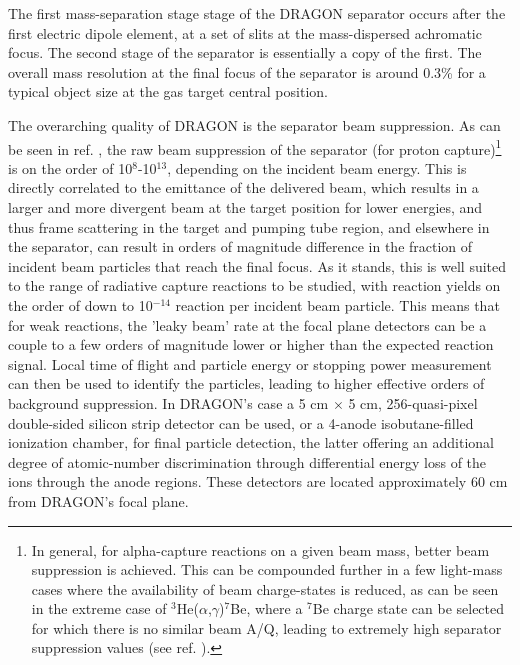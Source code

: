 The first mass-separation stage stage of the DRAGON separator occurs after the first electric dipole element, at a set of slits at the mass-dispersed achromatic focus. The second stage of the separator is essentially a copy of the first. The overall mass resolution at the final focus of the separator is around 0.3\% for a typical object size at the gas target central position.  

The overarching quality of DRAGON is the separator beam suppression. As can be seen in ref. \cite{hutc08}, the raw beam suppression of the separator (for proton capture)\footnote{In general, for alpha-capture reactions on a given beam mass, better beam suppression is achieved. This can be compounded further in a few light-mass cases where the availability of beam charge-states is reduced, as can be seen in the extreme case of $^{3}$He($\alpha$,$\gamma$)$^{7}$Be, where a $^{7}$Be charge state can be selected for which there is no similar beam A/Q, leading to extremely high separator suppression values (see ref. \cite{sju12}).} is on the order of 10$^{8}$-10$^{13}$, depending on the incident beam energy. This is directly correlated to the emittance of the delivered beam, which results in a larger and more divergent beam at the target position for lower energies, and thus frame scattering in the target and pumping tube region, and elsewhere in the separator, can result in orders of magnitude difference in the fraction of incident beam particles that reach the final focus. As it stands, this is well suited to the range of radiative capture reactions to be studied, with reaction yields on the order of down to 10$^{-14}$ reaction per incident beam particle. This means that for weak reactions, the 'leaky beam' rate at the focal plane detectors can be a couple to a few orders of magnitude lower or higher than the expected reaction signal. Local time of flight and particle energy or stopping power measurement can then be used to identify the particles, leading to higher effective orders of background suppression. In DRAGON's case a 5 cm $\times$ 5 cm, 256-quasi-pixel double-sided silicon strip detector can be used, or a 4-anode isobutane-filled ionization chamber, for final particle detection, the latter offering an additional degree of atomic-number discrimination through differential energy loss of the ions through the anode regions. These detectors are located approximately 60 cm from DRAGON's focal plane.


